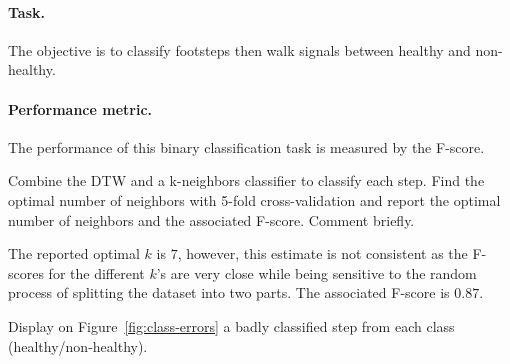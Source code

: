 \documentclass[11pt]{article}
\begin{document}
\paragraph{Task.} The objective is to classify footsteps then walk signals between healthy and non-healthy.

\paragraph{Performance metric.} The performance of this binary classification task is measured by the F-score.


\begin{exercise}
Combine the DTW and a k-neighbors classifier to classify each step. Find the optimal number of neighbors with 5-fold cross-validation and report the optimal number of neighbors and the associated F-score. Comment briefly.
\end{exercise}

\begin{solution}
The reported optimal $k$ is $7$, however, this estimate is not consistent as the F-scores for the different $k$'s are very close while being sensitive to the random process of splitting the dataset into two parts. The associated F-score is $0.87$.
\end{solution}

\newpage
\begin{exercise}\label{q:class-errors}
Display on Figure~\ref{fig:class-errors} a badly classified step from each class (healthy/non-healthy).
\end{exercise}
\end{document}
